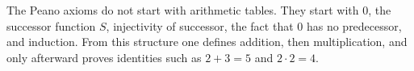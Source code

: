\begin{summarybox}
The Peano axioms do not start with arithmetic tables. They start with \(0\), the
successor function \(S\), injectivity of successor, the fact that \(0\) has no
predecessor, and induction. From this structure one defines addition, then
multiplication, and only afterward proves identities such as \(2+3=5\) and
\(2\cdot 2=4\).
\end{summarybox}
